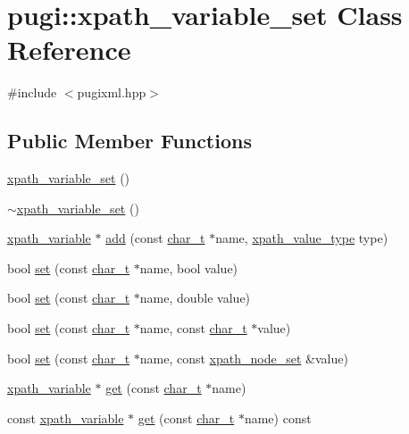\hypertarget{classpugi_1_1xpath__variable__set}{\section{pugi\-:\-:xpath\-\_\-variable\-\_\-set Class Reference}
\label{classpugi_1_1xpath__variable__set}
}


{\ttfamily \#include $<$pugixml.\-hpp$>$}

\subsection*{Public Member Functions}
\begin{DoxyCompactItemize}
\item 
\hyperlink{classpugi_1_1xpath__variable__set_a7d5fcd43e16c9e8fe22cbfa10375789d}{xpath\-\_\-variable\-\_\-set} ()
\item 
\hyperlink{classpugi_1_1xpath__variable__set_a6a0df4fa59236eee33ba902691330f70}{$\sim$xpath\-\_\-variable\-\_\-set} ()
\item 
\hyperlink{classpugi_1_1xpath__variable}{xpath\-\_\-variable} $\ast$ \hyperlink{classpugi_1_1xpath__variable__set_a07051524f1c6a54bf8f16c9506d6ed5e}{add} (const \hyperlink{namespacepugi_aef5a7a62cba0507542220ea15afe39df}{char\-\_\-t} $\ast$name, \hyperlink{namespacepugi_ae3820874caf240e9f311bfd2790a84d6}{xpath\-\_\-value\-\_\-type} type)
\item 
bool \hyperlink{classpugi_1_1xpath__variable__set_a461660115640e623fe53af3d9f6b7a05}{set} (const \hyperlink{namespacepugi_aef5a7a62cba0507542220ea15afe39df}{char\-\_\-t} $\ast$name, bool value)
\item 
bool \hyperlink{classpugi_1_1xpath__variable__set_a74c45684cc9b790601830f5c51bb8b89}{set} (const \hyperlink{namespacepugi_aef5a7a62cba0507542220ea15afe39df}{char\-\_\-t} $\ast$name, double value)
\item 
bool \hyperlink{classpugi_1_1xpath__variable__set_a6c97731437c5aa4d57b72185ee03451c}{set} (const \hyperlink{namespacepugi_aef5a7a62cba0507542220ea15afe39df}{char\-\_\-t} $\ast$name, const \hyperlink{namespacepugi_aef5a7a62cba0507542220ea15afe39df}{char\-\_\-t} $\ast$value)
\item 
bool \hyperlink{classpugi_1_1xpath__variable__set_a5835902a2662631836cc6457709b84ec}{set} (const \hyperlink{namespacepugi_aef5a7a62cba0507542220ea15afe39df}{char\-\_\-t} $\ast$name, const \hyperlink{classpugi_1_1xpath__node__set}{xpath\-\_\-node\-\_\-set} \&value)
\item 
\hyperlink{classpugi_1_1xpath__variable}{xpath\-\_\-variable} $\ast$ \hyperlink{classpugi_1_1xpath__variable__set_aca5af5d65cdf0f639890cc1d3caec610}{get} (const \hyperlink{namespacepugi_aef5a7a62cba0507542220ea15afe39df}{char\-\_\-t} $\ast$name)
\item 
const \hyperlink{classpugi_1_1xpath__variable}{xpath\-\_\-variable} $\ast$ \hyperlink{classpugi_1_1xpath__variable__set_a6a15d76060162ae19f7c175af0c15cc3}{get} (const \hyperlink{namespacepugi_aef5a7a62cba0507542220ea15afe39df}{char\-\_\-t} $\ast$name) const 
\end{DoxyCompactItemize}


